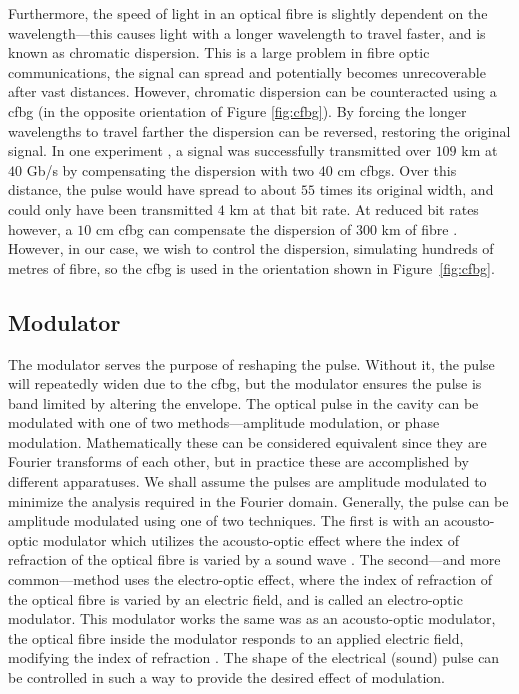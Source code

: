 Furthermore, the speed of light in an optical fibre is slightly dependent on the wavelength---this causes light with a longer wavelength to travel faster, and is known as chromatic dispersion. This is a large problem in fibre optic communications, the signal can spread and potentially becomes unrecoverable after vast distances. However, chromatic dispersion can be counteracted using a \gls{cfbg} \cite{agrawal2002, alazzawi, becker, starodoumov} (in the opposite orientation of Figure \ref{fig:cfbg}). By forcing the longer wavelengths to travel farther the dispersion can be reversed, restoring the original signal. In one experiment \cite{dong}, a signal was successfully transmitted over $109$ km at $40$ Gb/s by compensating the dispersion with two  $40$ cm \gls{cfbg}s. Over this distance, the pulse would have spread to about $55$ times its original width, and could only have been transmitted $4$ km at that bit rate. At reduced bit rates however, a $10$ cm \gls{cfbg} can compensate the dispersion of $300$ km of fibre \cite{agrawal2002}. However, in our case, we wish to control the dispersion, simulating hundreds of metres of fibre, so the \gls{cfbg} is used in the orientation shown in Figure~\ref{fig:cfbg}. \\

\subsection{Modulator}
The modulator serves the purpose of reshaping the pulse. Without it, the pulse will repeatedly widen due to the \gls{cfbg}, but the modulator ensures the pulse is band limited by altering the envelope. The optical pulse in the cavity can be modulated with one of two methods---amplitude modulation, or phase modulation. Mathematically these can be considered equivalent since they are Fourier transforms of each other, but in practice these are accomplished by different apparatuses. We shall assume the pulses are amplitude modulated to minimize the analysis required in the Fourier domain. Generally, the pulse can be amplitude modulated using one of two techniques. The first is with an acousto-optic modulator which utilizes the acousto-optic effect where the index of refraction of the optical fibre is varied by a sound wave \cite{hausbook, karim}. The second---and more common---method uses the electro-optic effect, where the index of refraction of the optical fibre is varied by an electric field, and is called an electro-optic modulator. This modulator works the same was as an acousto-optic modulator, the optical fibre inside the modulator responds to an applied electric field, modifying the index of refraction \cite{agrawal2002, goldstein, hausbook, karim}. The shape of the electrical (sound) pulse can be controlled in such a way to provide the desired effect of modulation. \\


